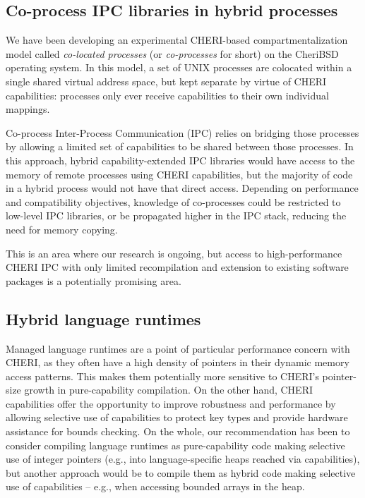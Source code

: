 \documentclass[12pt,twoside,openright,a4paper]{article}
\newcommand{\note}[2]{{\color{blue}[ Note: #1 - #2]}}
\renewcommand{\note}[2]{\relax\ifhmode\unskip\fi}
\newcommand{\nwfnote}[1]{\note{#1}{nwf}}
\newcommand{\dcnote}[1]{\note{#1}{David}}
\begin{document}
\subsection{Co-process IPC libraries in hybrid processes}
\label{section:co-processes}

We have been developing an experimental CHERI-based compartmentalization model
called \textit{co-located processes} (or \textit{co-processes} for short) on
the CheriBSD operating system.
In this model, a set of UNIX processes are colocated within a single shared
virtual address space, but kept separate by virtue of CHERI capabilities:
processes only ever receive capabilities to their own individual mappings.

Co-process Inter-Process Communication (IPC) relies on bridging those
processes by allowing a limited set of capabilities to be shared between those
processes.
In this approach, hybrid capability-extended IPC libraries would have access
to the memory of remote processes using CHERI capabilities, but the majority
of code in a hybrid process would not have that direct access.
Depending on performance and compatibility objectives, knowledge of
co-processes could be restricted to low-level IPC libraries, or be propagated
higher in the IPC stack, reducing the need for memory copying.

This is an area where our research is ongoing, but access to high-performance
CHERI IPC with only limited recompilation and extension to existing software
packages is a potentially promising area.

\subsection{Hybrid language runtimes}

Managed language runtimes are a point of particular performance concern with
CHERI, as they often have a high density of pointers in their dynamic memory
access patterns.
This makes them potentially more sensitive to CHERI's pointer-size growth in
pure-capability compilation.
On the other hand, CHERI capabilities offer the opportunity to improve
robustness and performance by allowing selective use of capabilities to
protect key types and provide hardware assistance for bounds checking.
On the whole, our recommendation has been to consider compiling language
runtimes as pure-capability code making selective use of integer pointers
(e.g., into language-specific heaps reached via capabilities), but
another approach would be to compile them as hybrid code making selective use
of capabilities -- e.g., when accessing bounded arrays in the heap.
\dcnote{It feels quite dangerous to have a single sentence about the
recommended way of doing things and a long document about the not-recommended
way.}
\nwfnote{Even if we've cited it recently, this is probably a good time to
emphatically point people at the right way~\cite{UCAM-CL-TR-947}.}
\end{document}
